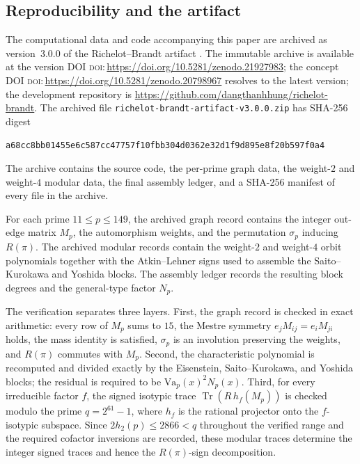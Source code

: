 \documentclass[11pt]{amsart}
\providecommand{\doi}[1]{\textsc{doi:}\,\url{https://doi.org/#1}}
\theoremstyle{plain}
\theoremstyle{definition}
\newcommand{\Va}{\mathrm{Va}}
\providecommand{\Va}{\mathrm{Va}}
\begin{document}
	\subsection{Reproducibility and the artifact}
	\label{ss:reproducibility}
	
	The computational data and code accompanying this paper are archived as
	version~3.0.0 of the Richelot--Brandt artifact
	\cite{artifact}. The immutable archive is available at the version DOI
	\doi{10.5281/zenodo.21927983}; the concept DOI
	\doi{10.5281/zenodo.20798967} resolves to the latest version; the development repository is
	\url{https://github.com/dangthanhhung/richelot-brandt}. The archived file
	\texttt{richelot-brandt-artifact-v3.0.0.zip} has SHA-256 digest
	\begin{center}
		\texttt{a68cc8bb01455e6c587cc47757f10fbb\allowbreak 304d0362e32d1f9d895e8f20b597f0a4}
	\end{center}
	The archive
	contains the source code, the per-prime graph data, the weight-$2$ and
	weight-$4$ modular data, the final assembly ledger, and a SHA-256 manifest
	of every file in the archive.
	
	For each prime $11\le p\le149$, the archived graph record contains the
	integer out-edge matrix $M_p$, the automorphism weights, and the
	permutation $\sigma_p$ inducing $R(\pi)$. The archived modular records
	contain the weight-$2$ and weight-$4$ orbit polynomials together with the
	Atkin--Lehner signs used to assemble the Saito--Kurokawa and Yoshida
	blocks. The assembly ledger records the resulting block degrees and the
	general-type factor $N_p$.
	
	The verification separates three layers. First, the graph record is
	checked in exact arithmetic: every row of $M_p$ sums to $15$, the Mestre
	symmetry $e_jM_{ij}=e_iM_{ji}$ holds, the mass identity is satisfied,
	$\sigma_p$ is an involution preserving the weights, and $R(\pi)$ commutes
	with $M_p$. Second, the characteristic polynomial is recomputed and
	divided exactly by the Eisenstein, Saito--Kurokawa, and Yoshida blocks;
	the residual is required to be $\Va_p(x)^2N_p(x)$. Third, for every
	irreducible factor $f$, the signed isotypic trace
	$\operatorname{Tr}(R\,h_f(M_p))$ is checked modulo the prime
	$q=2^{61}-1$, where $h_f$ is the rational projector onto the
	$f$-isotypic subspace. Since $2h_2(p)\le2866<q$ throughout the verified
	range and the required cofactor inversions are recorded, these modular
	traces determine the integer signed traces and hence the
	$R(\pi)$-sign decomposition.
	
\end{document}
